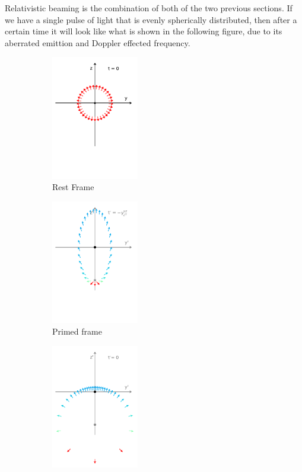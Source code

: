 Relativistic beaming is the combination of both of the two previous sections.
If we have a single pulse of light that is evenly spherically distributed, then after a certain time it will look like what is shown in the following figure, due to its aberrated emittion and Doppler effected frequency.

\begin{figure}[H]
	\begin{subfigure}{.32\textwidth}
		\centering
		\includegraphics[width = 3.8cm]{images/pdf/Rest_Pulse.pdf}
		\caption{Rest Frame \newline}
		\label{fig: Relativistic beaming 1}
	\end{subfigure}
	\begin{subfigure}{.32\textwidth}
		\centering
		\includegraphics[width = 3.8cm]{images/pdf/Prime_Pulse.pdf}
		\caption{Primed frame \newline}
		\label{fig: Relativistic beaming 2}
	\end{subfigure}
	\begin{subfigure}{.32\textwidth}
		\centering
		\includegraphics[width = 3.8cm]{images/pdf/Prime_Pulse_Simultaneous.pdf}

\end{subfigure}
\end{figure}
